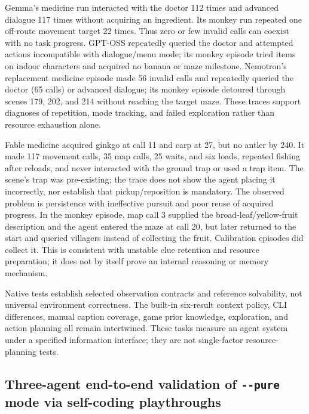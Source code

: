 \documentclass[11pt,a4paper]{article}
\begin{document}
Gemma's medicine run interacted with the doctor 112 times and advanced dialogue 117 times without acquiring an ingredient. Its monkey run repeated one off-route movement target 22 times. Thus zero or few invalid calls can coexist with no task progress. GPT-OSS repeatedly queried the doctor and attempted actions incompatible with dialogue/menu mode; its monkey episode tried items on indoor characters and acquired no banana or maze milestone. Nemotron's replacement medicine episode made 56 invalid calls and repeatedly queried the doctor (65 calls) or advanced dialogue; its monkey episode detoured through scenes 179, 202, and 214 without reaching the target maze. These traces support diagnoses of repetition, mode tracking, and failed exploration rather than resource exhaustion alone.

Fable medicine acquired ginkgo at call 11 and carp at 27, but no antler by 240. It made 117 movement calls, 35 map calls, 25 waits, and six loads, repeated fishing after reloads, and never interacted with the ground trap or used a trap item. The scene's trap was pre-existing; the trace does not show the agent placing it incorrectly, nor establish that pickup/reposition is mandatory. The observed problem is persistence with ineffective pursuit and poor reuse of acquired progress. In the monkey episode, map call 3 supplied the broad-leaf/yellow-fruit description and the agent entered the maze at call 20, but later returned to the start and queried villagers instead of collecting the fruit. Calibration episodes did collect it. This is consistent with unstable clue retention and resource preparation; it does not by itself prove an internal reasoning or memory mechanism.

Native tests establish selected observation contracts and reference solvability, not universal environment correctness. The built-in six-result context policy, CLI differences, manual caption coverage, game prior knowledge, exploration, and action planning all remain intertwined. These tasks measure an agent system under a specified information interface; they are not single-factor resource-planning tests.

\subsection{\texorpdfstring{Three-agent end-to-end validation of \texttt{-\allowbreak{}-\allowbreak{}pure} mode via self-coding playthroughs}{Three-agent end-to-end validation of --pure mode via self-coding playthroughs}}
\end{document}
